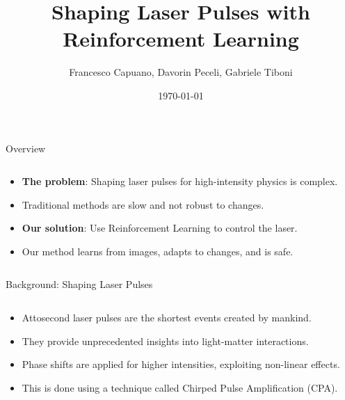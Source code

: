 \documentclass{beamer}
\title{Shaping Laser Pulses with Reinforcement Learning}
\author{Francesco Capuano, Davorin Peceli, Gabriele Tiboni}
\date{\today}
\begin{document}
\begin{frame}
  \titlepage
\end{frame}

\begin{frame}{Overview}
\begin{columns}[T,totalwidth=\textwidth]
    \begin{column}{0.5\textwidth}
        \begin{itemize}
            \item \textbf{The problem}: Shaping laser pulses for high-intensity physics is complex.
            \item Traditional methods are slow and not robust to changes.
            \item \textbf{Our solution}: Use Reinforcement Learning to control the laser.
            \item Our method learns from images, adapts to changes, and is safe.
        \end{itemize}
    \end{column}
    \begin{column}{0.5\textwidth}
    \end{column}
\end{columns}
\end{frame}

\begin{frame}{Background: Shaping Laser Pulses}
\begin{columns}[T,totalwidth=\textwidth]
    \begin{column}{0.5\textwidth}
        \begin{itemize}
            \item Attosecond laser pulses are the shortest events created by mankind.
            \item They provide unprecedented insights into light-matter interactions.
            \item Phase shifts are applied for higher intensities, exploiting non-linear effects.
            \item This is done using a technique called Chirped Pulse Amplification (CPA).
        \end{itemize}
    \end{column}
    \begin{column}{0.5\textwidth}
    \end{column}
\end{columns}
\end{frame}
\end{document}
